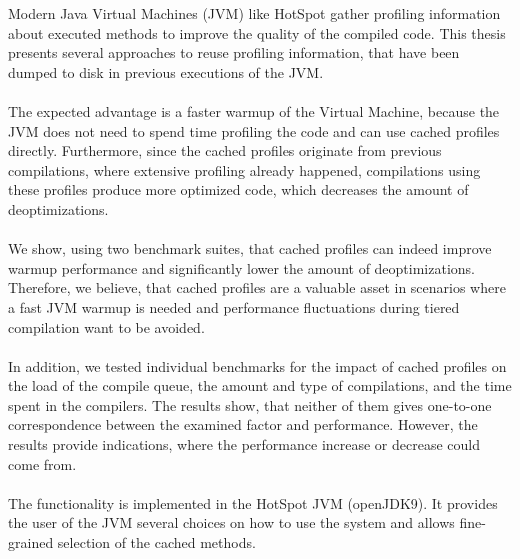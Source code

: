 Modern Java Virtual Machines (JVM) like HotSpot gather profiling information about executed methods to improve the quality of the compiled code.
This thesis presents several approaches to reuse profiling information, that have been dumped to disk in previous executions of the JVM.
\\\\
The expected advantage is a faster warmup of the Virtual Machine, because the JVM does not need to spend time profiling the code and can use cached profiles directly.
Furthermore, since the cached profiles originate from previous compilations, where extensive profiling already happened, compilations using these profiles produce more optimized code, which decreases the amount of deoptimizations.
\\\\
We show, using two benchmark suites, that cached profiles can indeed improve warmup performance and significantly lower the amount of deoptimizations.
Therefore, we believe, that cached profiles are a valuable asset in scenarios where a fast JVM warmup is needed and performance fluctuations during tiered compilation want to be avoided.
\\\\
In addition, we tested individual benchmarks for the impact of cached profiles on the load of the compile queue, the amount and type of compilations, and the time spent in the compilers. The results show, that neither of them gives one-to-one correspondence between the examined factor and performance. However, the results provide indications, where the performance increase or decrease could come from.
\\\\
The functionality is implemented in the HotSpot JVM (openJDK9). It provides the user of the JVM several choices on how to use the system and allows fine-grained selection of the cached methods.
